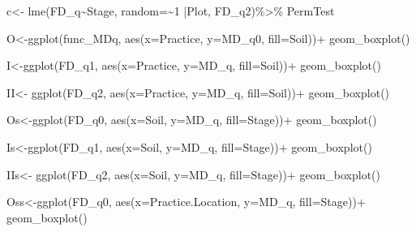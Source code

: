 \documentclass[]{interact}
\theoremstyle{plain}%
\theoremstyle{definition}
\theoremstyle{remark}
\newenvironment{Shaded}{\begin{snugshade}}{\end{snugshade}}
\newcommand{\AttributeTok}[1]{\textcolor[rgb]{0.77,0.63,0.00}{#1}}
\newcommand{\DecValTok}[1]{\textcolor[rgb]{0.00,0.00,0.81}{#1}}
\newcommand{\FunctionTok}[1]{\textcolor[rgb]{0.00,0.00,0.00}{#1}}
\newcommand{\NormalTok}[1]{#1}
\newcommand{\OtherTok}[1]{\textcolor[rgb]{0.56,0.35,0.01}{#1}}
\newcommand{\SpecialCharTok}[1]{\textcolor[rgb]{0.00,0.00,0.00}{#1}}
\begin{document}
\begin{Shaded}
\begin{Highlighting}[]
\NormalTok{c}\OtherTok{\textless{}{-}} \FunctionTok{lme}\NormalTok{(FD\_q}\SpecialCharTok{\textasciitilde{}}\NormalTok{Stage, }\AttributeTok{random=}\SpecialCharTok{\textasciitilde{}}\DecValTok{1} \SpecialCharTok{|}\NormalTok{Plot, FD\_q2)}\SpecialCharTok{\%\textgreater{}\%}
\NormalTok{PermTest}


\NormalTok{O}\OtherTok{\textless{}{-}}\FunctionTok{ggplot}\NormalTok{(func\_MDq, }\FunctionTok{aes}\NormalTok{(}\AttributeTok{x=}\NormalTok{Practice, }\AttributeTok{y=}\NormalTok{MD\_q0, }\AttributeTok{fill=}\NormalTok{Soil))}\SpecialCharTok{+}
  \FunctionTok{geom\_boxplot}\NormalTok{()}
  

\NormalTok{I}\OtherTok{\textless{}{-}}\FunctionTok{ggplot}\NormalTok{(FD\_q1, }\FunctionTok{aes}\NormalTok{(}\AttributeTok{x=}\NormalTok{Practice, }\AttributeTok{y=}\NormalTok{MD\_q, }\AttributeTok{fill=}\NormalTok{Soil))}\SpecialCharTok{+}
  \FunctionTok{geom\_boxplot}\NormalTok{()}

\NormalTok{II}\OtherTok{\textless{}{-}} \FunctionTok{ggplot}\NormalTok{(FD\_q2, }\FunctionTok{aes}\NormalTok{(}\AttributeTok{x=}\NormalTok{Practice, }\AttributeTok{y=}\NormalTok{MD\_q, }\AttributeTok{fill=}\NormalTok{Soil))}\SpecialCharTok{+}
  \FunctionTok{geom\_boxplot}\NormalTok{()}
  
\NormalTok{Os}\OtherTok{\textless{}{-}}\FunctionTok{ggplot}\NormalTok{(FD\_q0, }\FunctionTok{aes}\NormalTok{(}\AttributeTok{x=}\NormalTok{Soil, }\AttributeTok{y=}\NormalTok{MD\_q, }\AttributeTok{fill=}\NormalTok{Stage))}\SpecialCharTok{+}
  \FunctionTok{geom\_boxplot}\NormalTok{()}

\NormalTok{Is}\OtherTok{\textless{}{-}}\FunctionTok{ggplot}\NormalTok{(FD\_q1, }\FunctionTok{aes}\NormalTok{(}\AttributeTok{x=}\NormalTok{Soil, }\AttributeTok{y=}\NormalTok{MD\_q, }\AttributeTok{fill=}\NormalTok{Stage))}\SpecialCharTok{+}
  \FunctionTok{geom\_boxplot}\NormalTok{()}

\NormalTok{IIs}\OtherTok{\textless{}{-}} \FunctionTok{ggplot}\NormalTok{(FD\_q2, }\FunctionTok{aes}\NormalTok{(}\AttributeTok{x=}\NormalTok{Soil, }\AttributeTok{y=}\NormalTok{MD\_q, }\AttributeTok{fill=}\NormalTok{Stage))}\SpecialCharTok{+}
  \FunctionTok{geom\_boxplot}\NormalTok{()}

\NormalTok{Oss}\OtherTok{\textless{}{-}}\FunctionTok{ggplot}\NormalTok{(FD\_q0, }\FunctionTok{aes}\NormalTok{(}\AttributeTok{x=}\NormalTok{Practice.Location, }\AttributeTok{y=}\NormalTok{MD\_q, }\AttributeTok{fill=}\NormalTok{Stage))}\SpecialCharTok{+}
  \FunctionTok{geom\_boxplot}\NormalTok{()}


\end{Highlighting}
\end{Shaded}
\end{document}
